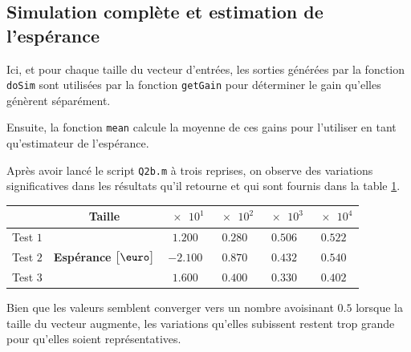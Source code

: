 \documentclass[a4paper, 12pt]{article}
\begin{document}
	\subsection{Simulation complète et estimation de l'espérance}
	Ici, et pour chaque taille du vecteur d'entrées, les sorties générées par la fonction \texttt{doSim} sont utilisées par la fonction \texttt{getGain} pour déterminer le gain qu'elles génèrent séparément. \par
	Ensuite, la fonction \texttt{mean} calcule la moyenne de ces gains pour l'utiliser en tant qu'estimateur de l'espérance. \par
	Après avoir lancé le script \texttt{Q2b.m} à trois reprises, on observe des variations significatives dans les résultats qu'il retourne et qui sont fournis dans la table \ref{table: Q2b}.
	\begin{table}[H]
		\centering
		\begin{tabular}{|c|c|c|c|c|c|}
			\hline
			         &                       \textbf{Taille}                        &   $\num{e1}$   &  $\num{e2}$   &  $\num{e3}$   &  $\num{e4}$   \\ \hline\hline
			Test $1$ & \multirow{3}{*}{\textbf{Espérance} $\big[\text{\euro}\big]$} & $\num{1.200}$  & $\num{0.280}$ & $\num{0.506}$ & $\num{0.522}$ \\ \cline{1-1}\cline{3-6}
			Test $2$ &                                                              & $\num{-2.100}$ & $\num{0.870}$ & $\num{0.432}$ & $\num{0.540}$ \\ \cline{1-1}\cline{3-6}
			Test $3$ &                                                              & $\num{1.600}$  & $\num{0.400}$ & $\num{0.330}$ & $\num{0.402}$ \\ \hline
		\end{tabular}
		\label{table: Q2b}
	\end{table}
	Bien que les valeurs semblent converger vers un nombre avoisinant $\num{0.5}$ lorsque la taille du vecteur augmente, les variations qu'elles subissent restent trop grande pour qu'elles soient représentatives.
\end{document}

